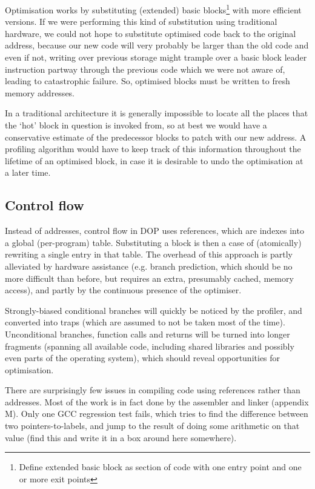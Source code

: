 Optimisation works by substituting (extended) basic blocks\footnote{Define extended basic block as section of code with one entry point and one or more exit points} with more efficient versions. If we were performing this kind of substitution using traditional hardware, we could not hope to substitute optimised code back to the original address, because our new code will very probably be larger than the old code and even if not, writing over previous storage might trample over a basic block leader instruction partway through the previous code which we were not aware of, leading to catastrophic failure. So, optimised blocks must be written to fresh memory addresses.

In a traditional architecture it is generally impossible to locate all the places that the `hot' block in question is invoked from, so at best we would have a conservative estimate of the predecessor blocks to patch with our new address. A profiling algorithm would have to keep track of this information throughout the lifetime of an optimised block, in case it is desirable to undo the optimisation at a later time.

\subsection{Control flow}

Instead of addresses, control flow in DOP uses references, which are indexes into a global (per-program) table. Substituting a block is then a case of (atomically) rewriting a single entry in that table. The overhead of this approach is partly alleviated by hardware assistance (e.g. branch prediction, which should be no more difficult than before, but requires an extra, presumably cached, memory access), and partly by the continuous presence of the optimiser.

Strongly-biased conditional branches will quickly be noticed by the profiler, and converted into traps (which are assumed to not be taken most of the time). Unconditional branches, function calls and returns will be turned into longer fragments (spanning all available code, including shared libraries and possibly even parts of the operating system), which should reveal opportunities for optimisation.

There are surprisingly few issues in compiling code using references rather than addresses. Most of the work is in fact done by the assembler and linker (appendix M). Only one GCC regression test fails, which tries to find the difference between two pointers-to-labels, and jump to the result of doing some arithmetic on that value (find this and write it in a box around here somewhere).

